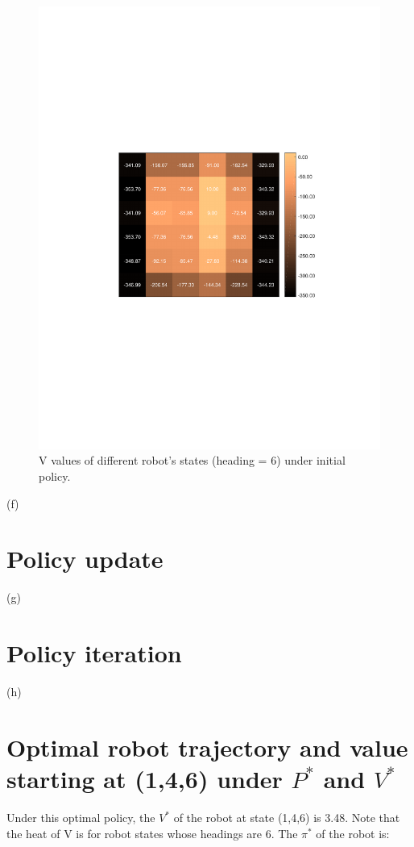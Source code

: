 \documentclass{article}
\begin{document}
	\begin{figure}[h!]
		\centering
		\includegraphics[trim={5cm 9cm 3cm 5cm},clip,scale = 1]{plots/PolicyIteration/3e.pdf}
		\caption{V values of different robot's states (heading = 6) under initial policy.}
	\end{figure}

	\newpage
	(f) 	
	\section*{Policy update}
	

	\newpage
	(g) 	
	\section*{Policy iteration}
	

	\newpage
	(h)
	\section*{Optimal robot trajectory and value starting at (1,4,6) under $P^*$ and $V^*$}
	Under this optimal policy, the $V^*$ of the robot at state (1,4,6) is 3.48. Note that the heat of V is for robot states whose headings are 6.	The $\pi^{*}$ of the robot is: \\
	
\end{document}
